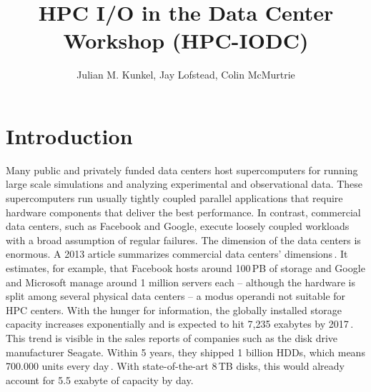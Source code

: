 \documentclass{llncs}
\begin{document}
\mainmatter


\author{Julian M. Kunkel, Jay Lofstead, Colin McMurtrie
} 

\title{HPC I/O in the Data Center Workshop (HPC-IODC)}


\maketitle{}


\section{Introduction}
\label{sec:intro}

Many public and privately funded data centers host supercomputers for running large scale simulations and analyzing experimental and observational data.
These supercomputers run usually tightly coupled parallel applications that require hardware components that deliver the best performance.
In contrast, commercial data centers, such as Facebook and Google, execute loosely coupled workloads with a broad assumption of regular failures.
The dimension of the data centers is enormous.
A 2013 article summarizes commercial data centers' dimensions\,\cite{data13}. It estimates, for example, that 
Facebook hosts around 100\,PB of storage and Google and Microsoft manage around 1 million servers each -- although the hardware is split among several physical data centers -- a modus operandi not suitable for HPC centers.
With the hunger for information, the globally installed storage capacity increases exponentially and is expected to hit 7,235 exabytes by 2017\,\cite{EXA13}.
This trend is visible in the sales reports of companies such as the disk drive manufacturer Seagate. Within 5 years, they shipped 1 billion HDDs, which means 700.000 units every day\,\cite{SG14}.  
With state-of-the-art 8\,TB disks, this would already account for 5.5 exabyte of capacity by day.
\end{document}
